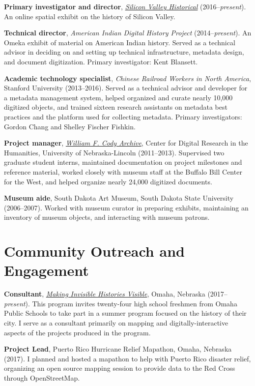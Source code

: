 \textbf{Primary investigator and director},
\emph{\href{http://svhistorical.org}{Silicon Valley Historical}}
(2016--\emph{present}). An online spatial exhibit on the history of
Silicon Valley.

\textbf{Technical director}, \emph{American Indian Digital History
Project} (2014--\emph{present}). An Omeka exhibit of material on
American Indian history. Served as a technical advisor in deciding on
and setting up technical infrastructure, metadata design, and document
digitization. Primary investigator: Kent Blansett.

\textbf{Academic technology specialist}, \emph{Chinese Railroad Workers
in North America}, Stanford University (2013--2016). Served as a
technical advisor and developer for a metadata management system, helped
organized and curate nearly 10,000 digitized objects, and trained
sixteen research assistants on metadata best practices and the platform
used for collecting metadata. Primary investigators: Gordon Chang and
Shelley Fischer Fishkin.

\textbf{Project manager}, \emph{\href{http://codyarchive.org}{William F.
Cody Archive}}, Center for Digital Research in the Humanities,
University of Nebraska-Lincoln (2011--2013). Supervised two graduate
student interns, maintained documentation on project milestones and
reference material, worked closely with museum staff at the Buffalo Bill
Center for the West, and helped organize nearly 24,000 digitized
documents.

\textbf{Museum aide}, South Dakota Art Museum, South Dakota State
University (2006--2007). Worked with museum curator in preparing
exhibits, maintaining an inventory of museum objects, and interacting
with museum patrons.

\section{Community Outreach and
Engagement}\label{community-outreach-and-engagement}

\textbf{Consultant}, \emph{\href{http://invisiblehistory.ops.org}{Making
Invisible Histories Visible}}, Omaha, Nebraska (2017--\emph{present}).
This program invites twenty-four high school freshmen from Omaha Public
Schools to take part in a summer program focused on the history of their
city. I serve as a consultant primarily on mapping and
digitally-interactive aspects of the projects produced in the program.

\textbf{Project Lead}, Puerto Rico Hurricane Relief Mapathon, Omaha,
Nebraska (2017). I planned and hosted a mapathon to help with Puerto
Rico disaster relief, organizing an open source mapping session to
provide data to the Red Cross through OpenStreetMap.

